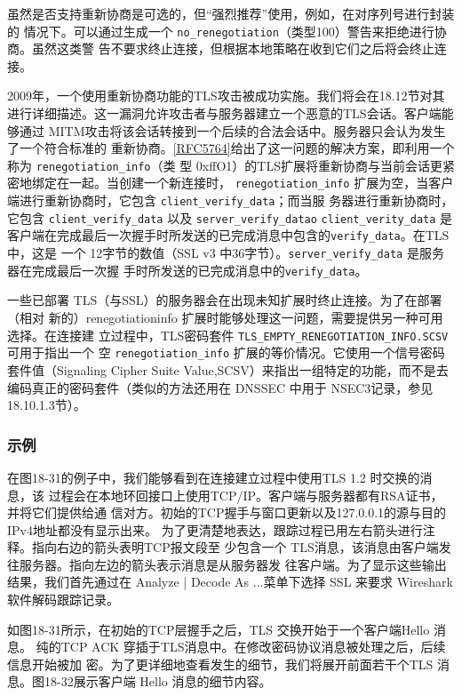 虽然是否支持重新协商是可选的，但“强烈推荐”使用，例如，在对序列号进行封装的
情况下。可以通过生成一个 \verb|no_renegotiation|（类型100）警告来拒绝进行协商。虽然这类警
告不要求终止连接，但根据本地策略在收到它们之后将会终止连接。

2009年，一个使用重新协商功能的TLS攻击被成功实施。我们将会在18.12节对其
进行详细描述。这一漏洞允许攻击者与服务器建立一个恶意的TLS会话。客户端能够通过
MITM攻击将该会话转接到一个后续的合法会话中。服务器只会认为发生了一个符合标准的
重新协商。\href{https://www.rfc-editor.org/rfc/rfc5764}{[RFC5764]}给出了这一问题的解决方案，即利用一个称为 \verb|renegotiation_info|（类
型 0xffO1）的TLS扩展将重新协商与当前会话更紧密地绑定在一起。当创建一个新连接时，
\verb|renegotiation_info| 扩展为空，当客户端进行重新协商时，它包含 \verb|client_verify_data|；而当服
务器进行重新协商时，它包含 \verb|client_verify_data| 以及 \verb|server_verify_datao| \verb|client_verity_data|
是客户端在完成最后一次握手时所发送的已完成消息中包含的\verb|verify_data|。在TLS 中，这是
一个 12字节的数值（SSL v3 中36字节）。\verb|server_verify_data| 是服务器在完成最后一次握
手时所发送的已完成消息中的\verb|verify_data|。

一些已部署 TLS（与SSL）的服务器会在出现未知扩展时终止连接。为了在部署（相对
新的）renegotiationinfo 扩展时能够处理这一问题，需要提供另一种可用选择。在连接建
立过程中，TLS密码套件 \verb|TLS_EMPTY_RENEGOTIATION_INFO.SCSV| 可用于指出一个
空 \verb|renegotiation_info| 扩展的等价情况。它使用一个信号密码套件值（Signaling Cipher Suite
Value,SCSV）来指出一组特定的功能，而不是去编码真正的密码套件（类似的方法还用在
DNSSEC 中用于 NSEC3记录，参见18.10.1.3节）。
\subsubsection{示例}
在图18-31的例子中，我们能够看到在连接建立过程中使用TLS 1.2 时交换的消息，该
过程会在本地环回接口上使用TCP/IP。客户端与服务器都有RSA证书，并将它们提供给通
信对方。初始的TCP握手与窗口更新以及127.0.0.1的源与目的IPv4地址都没有显示出来。
为了更清楚地表达，跟踪过程已用左右箭头进行注释。指向右边的箭头表明TCP报文段至
少包含一个 TLS消息，该消息由客户端发往服务器。指向左边的箭头表示消息是从服务器发
往客户端。为了显示这些输出结果，我们首先通过在 Analyze | Decode As ...菜单下选择 SSL
来要求 Wireshark 软件解码跟踪记录。

如图18-31所示，在初始的TCP层握手之后，TLS 交换开始于一个客户端Hello 消息。
纯的TCP ACK 穿插于TLS消息中。在修改密码协议消息被处理之后，后续信息开始被加
密。为了更详细地查看发生的细节，我们将展开前面若干个TLS 消息。图18-32展示客户端
Hello 消息的细节内容。

